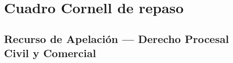 \documentclass[12pt,oneside]{book}
\begin{document}

\chapter{Cuadro Cornell de repaso}

\section*{Recurso de Apelación --- Derecho Procesal Civil y Comercial}
\end{document}
